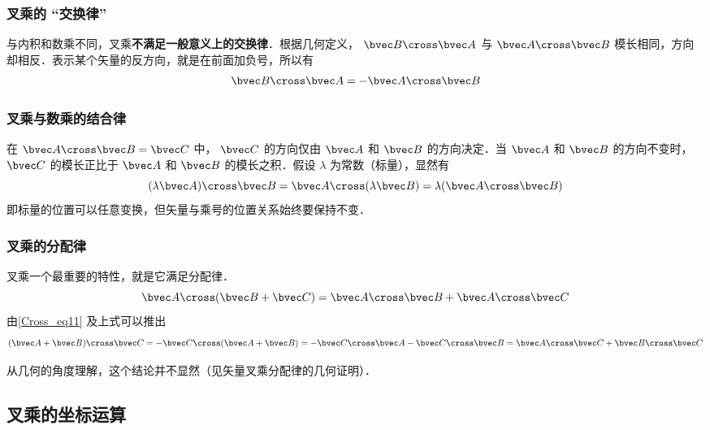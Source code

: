 \subsubsection{叉乘的 “交换律”}
与内积和数乘不同，叉乘\textbf{不满足一般意义上的交换律}．根据几何定义， $\bvec B \cross \bvec A$ 与 $\bvec A \cross \bvec B$ 模长相同，方向却相反．表示某个矢量的反方向，就是在前面加负号，所以有
\begin{equation}\label{Cross_eq11}
\bvec B \cross \bvec A = -\bvec A \cross \bvec B
\end{equation}

\subsubsection{叉乘与数乘的结合律}

在 $\bvec A \cross \bvec B = \bvec C$ 中， $\bvec C$ 的方向仅由 $\bvec A$ 和 $\bvec B$ 的方向决定．当 $\bvec A$ 和 $\bvec B$ 的方向不变时， $\bvec C$ 的模长正比于 $\bvec A$ 和 $\bvec B$ 的模长之积．假设 $\lambda $ 为常数（标量），显然有
\begin{equation}
(\lambda \bvec A) \cross \bvec B = \bvec A \cross (\lambda \bvec B) = \lambda (\bvec A \cross \bvec B)
\end{equation}
即标量的位置可以任意变换，但矢量与乘号的位置关系始终要保持不变．

\subsubsection{叉乘的分配律}

叉乘一个最重要的特性，就是它满足分配律．
\begin{equation}\label{Cross_eq6}
\bvec A \cross (\bvec B +\bvec C) = \bvec A \cross \bvec B + \bvec A \cross \bvec C
\end{equation}
由\autoref{Cross_eq11} 及上式可以推出
\begin{equation}\label{Cross_eq7}
(\bvec A + \bvec B) \cross \bvec C =  - \bvec C \cross (\bvec A + \bvec B) =  - \bvec C \cross \bvec A - \bvec C \cross \bvec B = \bvec A \cross \bvec C + \bvec B \cross \bvec C
\end{equation}

从几何的角度理解，这个结论并不显然（见矢量叉乘分配律的几何证明）．

\subsection{叉乘的坐标运算}
